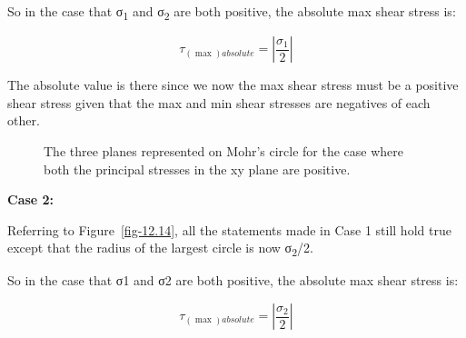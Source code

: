 \documentclass[
  letterpaper,
  DIV=11,
  numbers=noendperiod]{scrreprt}
\theoremstyle{definition}
\theoremstyle{remark}
\begin{document}
So in the case that σ\textsubscript{1} and σ\textsubscript{2} are both
positive, the absolute max shear stress is:

\[
\tau_{(\max )absolute}=\left|\frac{\sigma_1}{2}\right|
\]

The absolute value is there since we now the max shear stress must be a
positive shear stress given that the max and min shear stresses are
negatives of each other.

\begin{figure}


\caption{\label{fig-12.13}The three planes represented on Mohr's circle
for the case where both the principal stresses in the xy plane are
positive.}

\end{figure}%

\textbf{Case 2:}

Referring to Figure~\ref{fig-12.14}, all the statements made in Case 1
still hold true except that the radius of the largest circle is now
σ\textsubscript{2}/2.

So in the case that σ1 and σ2 are both positive, the absolute max shear
stress is:

\[
\tau_{(\max )absolute}=\left|\frac{\sigma_2}{2}\right|
\]
\end{document}
